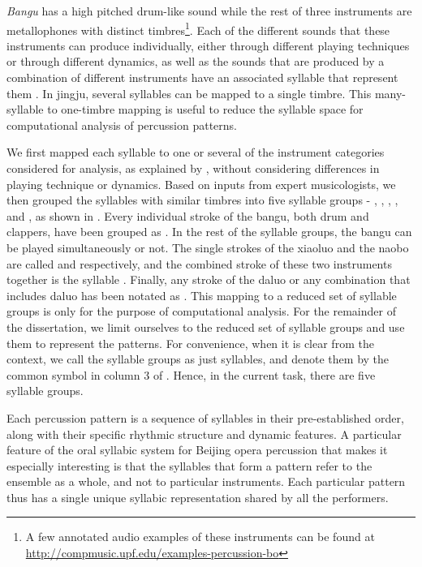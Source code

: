 \textit{Bangu} has a high pitched drum-like sound while the rest of three instruments are metallophones with distinct timbres\footnote{A few annotated audio examples of these instruments can be found at \url{http://compmusic.upf.edu/examples-percussion-bo}}. Each of the different sounds that these instruments can produce individually, either through different playing techniques or through different dynamics, as well as the sounds that are produced by a combination of different instruments have an associated syllable that represent them \cite{wenyi:07:boperf}. In \gls{jingju}, several syllables can be mapped to a single timbre. This many-syllable to one-timbre mapping is useful to reduce the syllable space for computational analysis of percussion patterns. 

We first mapped each syllable to one or several of the instrument categories considered for analysis, as explained by , without considering differences in playing technique or dynamics. Based on inputs from expert musicologists, we then grouped the syllables with similar timbres into five syllable groups - , , , , and , as shown in . Every individual stroke of the \gls{bangu}, both drum and clappers, have been grouped as . In the rest of the syllable groups, the \gls{bangu} can be played simultaneously or not. The single strokes of the \gls{xiaoluo} and the \gls{naobo} are called  and  respectively, and the combined stroke of these two instruments together is the syllable . Finally, any stroke of the \gls{daluo} or any combination that includes \gls{daluo} has been notated as . This mapping to a reduced set of syllable groups is only for the purpose of computational analysis. For the remainder of the dissertation, we limit ourselves to the reduced set of syllable groups and use them to represent the patterns. For convenience, when it is clear from the context, we call the syllable groups as just syllables, and denote them by the common symbol in column 3 of . Hence, in the current task, there are five syllable groups.

Each percussion pattern is a sequence of syllables in their pre-established order, along with their specific rhythmic structure and dynamic features. A particular feature of the oral syllabic system for Beijing opera percussion that makes it especially interesting is that the syllables that form a pattern refer to the ensemble as a whole, and not to particular instruments. Each particular pattern thus has a single unique syllabic representation shared by all the performers. 

